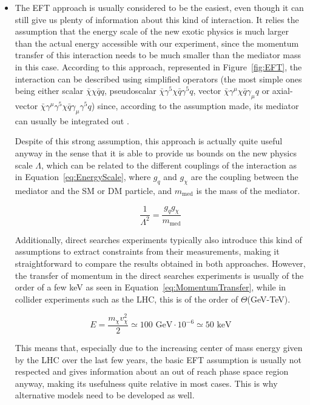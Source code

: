 \documentclass[a4paper, 10pt, openright]{report}
\begin{document}
\begin{itemize}
\item The \ac{EFT} approach is usually considered to be the easiest, even though it can still give us plenty of information about this kind of interaction. It relies the assumption that the energy scale of the new exotic physics is much larger than the actual energy accessible with our experiment, since the momentum transfer of this interaction needs to be much smaller than the mediator mass in this case. According to this approach, represented in Figure~\ref{fig:EFT}, the interaction can be described using simplified operators (the most simple ones being either scalar $\bar \chi \chi \bar q q$, pseudoscalar $\bar \chi \gamma^5 \chi \bar q \gamma^5 q$, vector $\bar \chi \gamma^{\mu} \chi \bar q \gamma_\mu q$ or axial-vector $\bar \chi \gamma^\mu \gamma^5 \chi \bar q \gamma_\mu \gamma^5 q$) since, according to the assumption made, its mediator can usually be integrated out \cite{ColliderSearches}. 

Despite of this strong assumption, this approach is actually quite useful anyway in the sense that it is able to provide us bounds on the new physics scale $\Lambda$, which can be related to the different couplings of the interaction as in Equation~\ref{eq:EnergyScale}, where $g_q$ and $g_\chi$ are the coupling between the mediator and the \ac{SM} or \ac{DM} particle, and $m_{\text{med}}$ is the mass of the mediator. 

\begin{equation}
\label{eq:EnergyScale}
\frac{1}{\Lambda^2} = \frac{g_q g_\chi}{m_{\text{med}}}
\end{equation}

Additionally, direct searches experiments typically also introduce this kind of assumptions to extract constraints from their measurements, making it straightforward to compare the results obtained in both approaches. However, the transfer of momentum in the direct searches experiments is usually of the order of a few keV as seen in Equation~\ref{eq:MomentumTransfer}, while in collider experiments such as the \ac{LHC}, this is of the order of $\Theta$(GeV-TeV).

\begin{equation}
\label{eq:MomentumTransfer}
E = \frac{m_\chi v_\chi^2}{2} \simeq 100 \text{ GeV} \cdot 10^{-6} \simeq 50 \text{ keV}
\end{equation}

This means that, especially due to the increasing center of mass energy given by the \ac{LHC} over the last few years, the basic \ac{EFT} assumption is usually not respected and gives information about an out of reach phase space region anyway, making its usefulness quite relative in most cases. This is why alternative models need to be developed as well.


\end{itemize}
\end{document}
